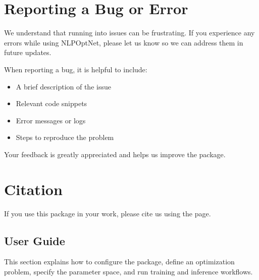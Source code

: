 \documentclass[letterpaper,10pt,english,openany,oneside]{sphinxmanual}
\begin{document}
\begin{sphinxVerbatim}[commandchars=\\\{\}]
\end{sphinxVerbatim}



\chapter{Reporting a Bug or Error}
\label{\detokenize{index:reporting-a-bug-or-error}}
\sphinxAtStartPar
We understand that running into issues can be frustrating. If you experience any errors while using NLPOpt\sphinxhyphen{}Net, please let us know so we can address them in future updates.

\sphinxAtStartPar
When reporting a bug, it is helpful to include:
\begin{itemize}
\item {} 
\sphinxAtStartPar
A brief description of the issue

\item {} 
\sphinxAtStartPar
Relevant code snippets

\item {} 
\sphinxAtStartPar
Error messages or logs

\item {} 
\sphinxAtStartPar
Steps to reproduce the problem

\end{itemize}

\sphinxAtStartPar
Your feedback is greatly appreciated and helps us improve the package.


\chapter{Citation}
\label{\detokenize{index:citation}}
\sphinxAtStartPar
If you use this package in your work, please cite us using the {\hyperref[\detokenize{citations::doc}]{}} page.

\sphinxstepscope


\section{User Guide}
\label{\detokenize{user-guide/index:user-guide}}\label{\detokenize{user-guide/index::doc}}
\sphinxAtStartPar
This section explains how to configure the package, define an optimization problem, specify the parameter space, and run training and inference workflows.
\end{document}
